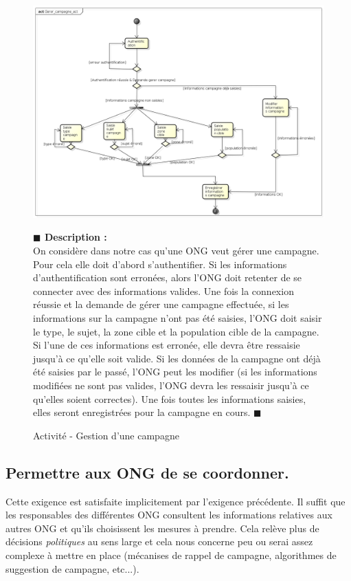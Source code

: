 \documentclass[11pt, titlepage]{report}
\newcommand{\debutDescription}{\noindent\textbf{\textcolor{DescriptionColor}{$\blacksquare$  Description : \\}}}
\newcommand{\finDescription}{\noindent\textcolor{DescriptionColor}{$\blacksquare$}}
\begin{document}
\begin{figure}[h!]
\begin{center}
\includegraphics[scale=.4]{../images/diagrammes/uml/exigence_2/act_gerer_campagne.png} 
\caption{Activité - Gestion d'une campagne}
\end{center}
\debutDescription
On considère dans notre cas qu'une ONG veut gérer une campagne. Pour cela elle doit d'abord s'authentifier. Si les informations d'authentification sont erronées, alors l'ONG doit retenter de se connecter avec des informations valides. Une fois la connexion réussie et la demande de gérer une campagne effectuée, si les informations sur la campagne n'ont pas été saisies, l'ONG doit saisir le type, le sujet, la zone cible et la population cible de la campagne. Si l'une de ces informations est erronée, elle devra être ressaisie jusqu'à ce qu'elle soit valide. Si les données de la campagne ont déjà été saisies par le passé, l'ONG peut les modifier (si les informations modifiées ne sont pas valides, l'ONG devra les ressaisir jusqu'à ce qu'elles soient correctes). Une fois toutes les informations saisies, elles seront enregistrées pour la campagne en cours.
\finDescription
\end{figure}


\clearpage
\subsection{Permettre aux ONG de se coordonner.}
Cette exigence est satisfaite implicitement par l'exigence précédente. Il suffit que les responsables des différentes ONG consultent les informations relatives aux autres ONG et qu'ils choisissent les mesures à prendre. Cela relève plus de décisions \textit{politiques} au sens large et cela nous concerne peu ou serai assez complexe à mettre en place (mécanises de rappel de campagne, algorithmes de suggestion de campagne, etc...).
\end{document}
